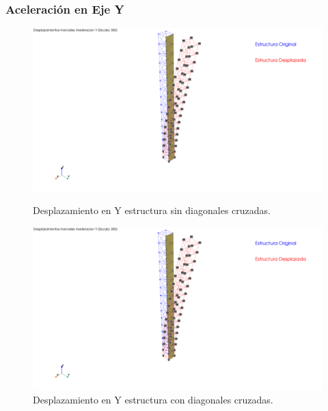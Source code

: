 \subsubsection{Aceleración en Eje Y}

\begin{figure}[H]
    \centering
    \begin{minipage}{0.45\textwidth}
        \centering
        \includegraphics[width=\textwidth]{GRAFICOS/Desplazamientos Inerciales Axeleracion Y False.png}
        \caption{Desplazamiento en Y estructura sin diagonales cruzadas.}
        \label{fig:imagen3}
    \end{minipage}
    \hfill
    \begin{minipage}{0.45\textwidth}
        \centering
        \includegraphics[width=\textwidth]{GRAFICOS/Desplazamientos Inerciales Axeleracion Y True.png}
        \caption{Desplazamiento en Y estructura con diagonales cruzadas.}
        \label{fig:imagen4}
    \end{minipage}
\end{figure}

